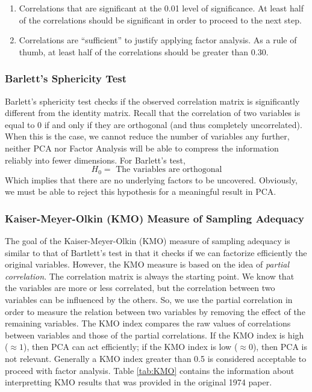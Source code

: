 \documentclass[
]{article}
\providecommand{\tightlist}{%
  \setlength{\itemsep}{0pt}\setlength{\parskip}{0pt}}
\theoremstyle{definition}
\theoremstyle{definition}
\theoremstyle{definition}
\theoremstyle{definition}
\theoremstyle{remark}
\begin{document}
\begin{enumerate}
\def\labelenumi{\arabic{enumi}.}
\tightlist
\item
  Correlations that are significant at the 0.01 level of significance. At least half of the correlations should be significant in order to proceed to the next step.
\item
  Correlations are ``sufficient'' to justify applying factor analysis. As a rule of thumb, at least half of the correlations should be greater than 0.30.
\end{enumerate}

\hypertarget{barletts-sphericity-test}{%
\subsubsection{Barlett's Sphericity Test}\label{barletts-sphericity-test}}

Barlett's sphericity test checks if the observed correlation matrix is significantly different from the identity matrix. Recall that the correlation of two variables is equal to 0 if and only if they are orthogonal (and thus completely uncorrelated). When this is the case, we cannot reduce the number of variables any further, neither PCA nor Factor Analysis will be able to compress the information reliably into fewer dimensions. For Barlett's test,
\[H_0 = \mbox{ The variables are orthogonal} \]
Which implies that there are no underlying factors to be uncovered. Obviously, we must be able to reject this hypothesis for a meaningful result in PCA.

\hypertarget{kaiser-meyer-olkin-kmo-measure-of-sampling-adequacy}{%
\subsubsection{Kaiser-Meyer-Olkin (KMO) Measure of Sampling Adequacy}\label{kaiser-meyer-olkin-kmo-measure-of-sampling-adequacy}}

The goal of the Kaiser-Meyer-Olkin (KMO) measure of sampling adequacy is similar to that of Bartlett's test in that it checks if we can factorize efficiently the original variables. However, the KMO measure is based on the idea of \emph{partial correlation}. The correlation matrix is always the starting point. We know that the variables are more or less correlated, but the correlation between two variables can be influenced by the others. So, we use the partial correlation in order to measure the relation between two variables by removing the effect of the remaining variables. The KMO index compares the raw values of correlations between variables and those of the partial correlations. If the KMO index is high (\(\approx 1\)), then PCA can act efficiently; if the KMO index is low (\(\approx 0\)), then PCA is not relevant. Generally a KMO index greater than 0.5 is considered acceptable to proceed with factor analysis. Table \ref{tab:KMO} contains the information about interpretting KMO results that was provided in the original 1974 paper.
\end{document}
